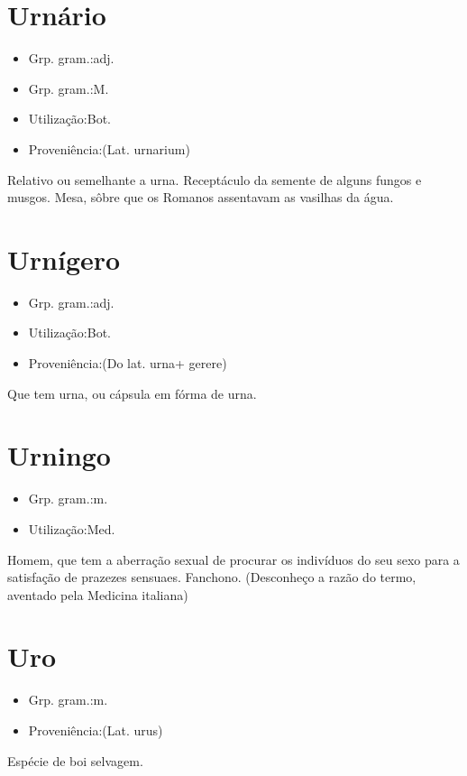 \documentclass{article}
\begin{document}
\section{Urnário}
\begin{itemize}
\item {Grp. gram.:adj.}
\end{itemize}
\begin{itemize}
\item {Grp. gram.:M.}
\end{itemize}
\begin{itemize}
\item {Utilização:Bot.}
\end{itemize}
\begin{itemize}
\item {Proveniência:(Lat. \textunderscore urnarium\textunderscore )}
\end{itemize}
Relativo ou semelhante a urna.
Receptáculo da semente de alguns fungos e musgos.
Mesa, sôbre que os Romanos assentavam as vasilhas da água.
\section{Urnígero}
\begin{itemize}
\item {Grp. gram.:adj.}
\end{itemize}
\begin{itemize}
\item {Utilização:Bot.}
\end{itemize}
\begin{itemize}
\item {Proveniência:(Do lat. \textunderscore urna\textunderscore  + \textunderscore gerere\textunderscore )}
\end{itemize}
Que tem urna, ou cápsula em fórma de urna.
\section{Urningo}
\begin{itemize}
\item {Grp. gram.:m.}
\end{itemize}
\begin{itemize}
\item {Utilização:Med.}
\end{itemize}
Homem, que tem a aberração sexual de procurar os indivíduos do seu sexo para a satisfação de prazezes sensuaes.
Fanchono.
(Desconheço a razão do termo, aventado pela Medicina italiana)
\section{Uro}
\begin{itemize}
\item {Grp. gram.:m.}
\end{itemize}
\begin{itemize}
\item {Proveniência:(Lat. \textunderscore urus\textunderscore )}
\end{itemize}
Espécie de boi selvagem.
\end{document}
